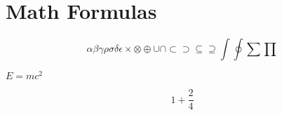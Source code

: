 \chapter{Math Formulas}\label{ch:math-formulas}
$$
\alpha
\beta
\gamma
\rho
\sigma
\delta
\epsilon
\times
\otimes
\oplus
\cup
\cap
\subset
\supset
\subseteq
\supseteq
\int
\oint
\sum
\prod
$$

$ E = mc^2 $

$$ 1+\frac{2}{4} $$

